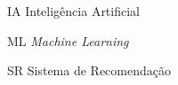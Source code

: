 \begin{siglas}
  \item[IA] Inteligência Artificial
  \item[ML] \textit{Machine Learning}
  \item[SR] Sistema de Recomendação
\end{siglas}
